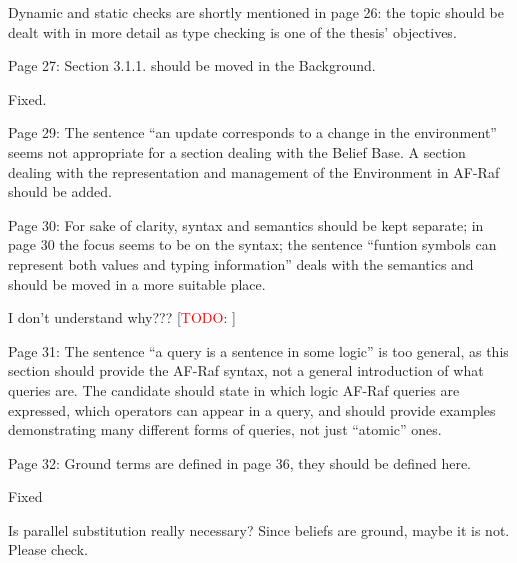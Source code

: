 \documentclass{article}
\newcommand{\todo}[1]{[\textcolor{red}{TODO}: #1]}
\newenvironment{them}{\noindent\begingroup\color{blue}}{\endgroup\par}
\begin{document}
\begin{them}

Dynamic and static checks are shortly mentioned in page 26: the topic should be
dealt with in more detail as type checking is one of the thesis' objectives.

\end{them}
\todo{expand this}

\begin{them}

Page 27:
Section 3.1.1. should be moved in the Background.
\end{them}
Fixed. 

\begin{them}

Page 29:
The sentence “an update corresponds to a change in the environment” seems not
appropriate for a section dealing with the Belief Base. A section dealing with
the representation and management of the Environment in AF-Raf should be added.

\end{them}
\todo{}

\begin{them}

Page 30:
For sake of clarity, syntax and semantics should be kept separate; in page 30
the focus seems to be on the syntax; the sentence “funtion symbols can
represent both values and typing information” deals with the semantics and
should be moved in a more suitable place.

\end{them}
I don't understand why???
\todo{}

\begin{them}

Page 31:
The sentence “a query is a sentence in some logic” is too general, as this
section should provide the AF-Raf syntax, not a general introduction of what
queries are. The candidate should state in which logic AF-Raf queries are
expressed, which operators can appear in a query, and should provide examples
demonstrating many different forms of queries, not just “atomic” ones.

\end{them}
\todo{}

\begin{them}

Page 32:
Ground terms are defined in page 36, they should be defined here.
\end{them}
Fixed

\begin{them}

Is parallel substitution really necessary? Since beliefs are ground, maybe it
is not. Please check.

\end{them}
\todo{}
\end{document}
